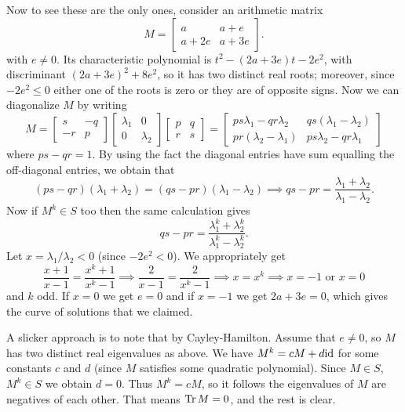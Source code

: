 \begin{problem}
\begin{sol}
		Now to see these are the only ones, consider an arithmetic matrix
		\[ M = \begin{bmatrix} a & a+e \\ a+2e & a+3e \end{bmatrix}. \]
		with $e \neq 0$.
		Its characteristic polynomial is $t^2 - (2a+3e)t - 2e^2$,
		with discriminant $(2a+3e)^2 + 8e^2$,
		so it has two distinct real roots; moreover, since $-2e^2 \le 0$
		either one of the roots is zero or they are of opposite signs.
		Now we can diagonalize $M$ by writing
		\[
			M =
			\begin{bmatrix} s & -q \\ -r & p \end{bmatrix}
			\begin{bmatrix} \lambda_1 & 0 \\ 0 & \lambda_2 \end{bmatrix}
			\begin{bmatrix} p & q \\ r & s \end{bmatrix}
			=
			\begin{bmatrix}
				ps\lambda_1 - qr\lambda_2 & qs(\lambda_1-\lambda_2) \\
				pr(\lambda_2-\lambda_1) & ps\lambda_2 - qr\lambda_1
			\end{bmatrix}
		\]
		where $ps-qr=1$. By using the fact the diagonal entries have sum equalling
		the off-diagonal entries, we obtain that
		\[ (ps-qr)(\lambda_1+\lambda_2) = (qs-pr)(\lambda_1-\lambda_2)
			\implies qs-pr = \frac{\lambda_1+\lambda_2}{\lambda_1-\lambda_2}. \]
		Now if $M^k \in S$ too then the same calculation gives
		\[ qs-pr = \frac{\lambda_1^k+\lambda_2^k}{\lambda_1^k-\lambda_2^k}. \]
		Let $x = \lambda_1/\lambda_2 < 0$ (since $-2e^2 < 0$). We appropriately get
		\[ \frac{x+1}{x-1} = \frac{x^k+1}{x^k-1}
			\implies \frac{2}{x-1} = \frac{2}{x^k-1}
			\implies x = x^k \implies x = -1 \text{ or } x = 0 \]
		and $k$ odd. If $x=0$ we get $e=0$ and if $x=-1$ we get $2a+3e=0$,
		which gives the curve of solutions that we claimed.

		A slicker approach is to note that by Cayley-Hamilton.
		Assume that $e \neq 0$, so $M$ has two distinct real eigenvalues as above.
		We have $M^k = cM + d\mathrm{id}$ for some constants $c$ and $d$
		(since $M$ satisfies some quadratic polynomial).
		Since $M \in S$, $M^k \in S$ we obtain $d=0$.
		Thus $M^k = cM$, so it follows the eigenvalues of $M$ are negatives of each other.
		That means $\operatorname{Tr} M = 0$, and the rest is clear.
	\end{sol}
\end{problem}



